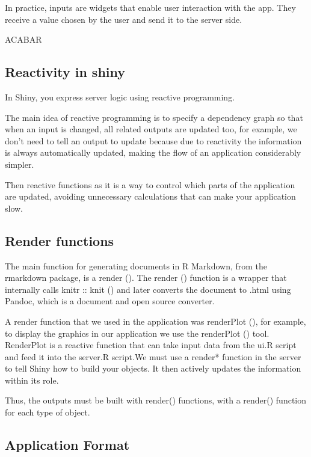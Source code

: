 \documentclass[11pt,a4paper]{report}
\begin{document}
In practice, inputs are widgets that enable user interaction with the app. They receive a value chosen by the user and send it to the server side.


ACABAR 








\subsection{Reactivity in shiny}
  In Shiny, you express server logic using reactive programming.
  
  
  The main idea of reactive programming is to specify a dependency graph so that when an input is changed, all related outputs are updated too, for example, we don't need to tell an output to update because due to reactivity the information is always automatically updated, making the flow of an application considerably simpler.
  

   Then reactive functions as it is a way to control which parts of the application are updated, avoiding unnecessary calculations that can make your application slow.

\subsection{Render functions}

The main function for generating documents in R Markdown, from the rmarkdown package, is a render ().
The render () function is a wrapper that internally calls knitr :: knit () and later converts the document to .html using Pandoc, which is a document and open source converter.


A render function that we used in the application was renderPlot (), for example, to display the graphics in our application we use the renderPlot () tool. RenderPlot is a reactive function that can take input data from the ui.R script and feed it into the server.R script.We must use a render* function in the server to tell Shiny how to build your objects. It then actively updates the information within its role.


Thus, the outputs must be built with render() functions, with a render() function for each type of object.




\subsection{Application Format}
  
\end{document}
